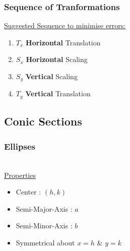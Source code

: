 \documentclass[../main.tex]{subfiles}
\begin{document}
\subsubsection{Sequence of Tranformations}
\underline{Suggested Sequence to minimise errors:}
\begin{enumerate}
    \item \(T_{x}\) \textbf{Horizontal} Translation
    \item \(S_{x}\) \textbf{Horizontal} Scaling
    \item \(S_{y}\) \textbf{Vertical} Scaling
    \item \(T_{y}\) \textbf{Vertical} Translation
\end{enumerate}

\subsection{Conic Sections}

\subsubsection{Ellipses}
 \\
\underline{Properties}
\begin{itemize}
    \item Center : \((h,k)\)
    \item Semi-Major-Axis : \(a\)
    \item Semi-Minor-Axis : \(b\)
    \item Symmetrical about \(x=h\) \& \(y=k\)
\end{itemize}
\newpage \noindent
\end{document}
